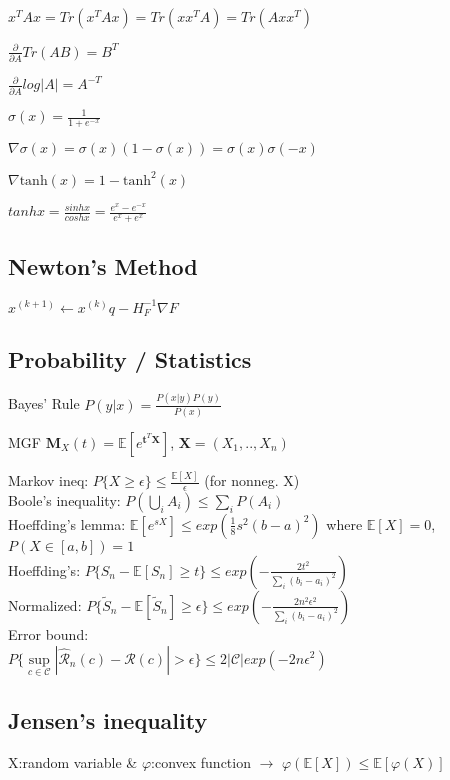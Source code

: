 \begin{inparaitem}[\color{red}\textbullet]
	\item $x^T A x = Tr(x^T A x) = Tr(x x^T A) = Tr(A x x^T)$ \\
	\item $\tfrac{\partial}{\partial A} Tr(AB) {=} B^T$
	\item $\frac{\partial}{\partial A} log|A| {=} A^{-T}$ \\
	\item $\sigma(x) = \frac{1}{1+e^{-x}}$ \\
	\item $\nabla \sigma(x) = \sigma(x)(1-\sigma(x)) = \sigma(x)\sigma(-x)$\\
	\item $\nabla \text{tanh}(x) = 1-\text{tanh}^2(x)$ 
	\item $tanhx {=} \frac{sinhx}{coshx} {=} \frac{e^{x}-e^{-x}}{e^{x} + e^{x}}$
\end{inparaitem}
\subsection*{Newton's Method}
$x^{(k+1)} \gets x^{(k)}q-H^{-1}_F\nabla F$
\subsection*{Probability / Statistics}
\begin{compactdesc}
	\item[Bayes' Rule]$ P(y|x) = \frac{P(x|y)P(y)}{P(x)}$\\
	\item[MGF] $\mathbf{M}_X(t)=\mathbb{E}[e^{\mathbf{t}^T \mathbf{X}}]$, $\mathbf{X}=(X_1,.., X_n) $
\end{compactdesc}

Markov ineq: $P\{X\geq\epsilon\} \leq \tfrac{\mathbb{E}[X]}{\epsilon}$ (for nonneg. X) \\
Boole's inequality: $P(\bigcup_i A_i) \leq \sum_i P(A_i)$ \\
Hoeffding's lemma: $\mathbb{E}[e^{sX}] \leq exp(\tfrac{1}{8}s^2(b-a)^2)$ where $\mathbb{E}[X]=0$, $P(X\in[a,b])=1$ \\
Hoeffding's: $P\{S_n {-} \mathbb{E}[S_n] {\geq} t\} {\leq} exp({-} \frac{2t^2}{\sum_i (b_i - a_i)^2})$ \\
Normalized: $P\{\widetilde{S}_n {-} \mathbb{E}[\widetilde{S}_n] {\geq} \epsilon\} {\leq} exp({-} \frac{2n^2 \epsilon ^2}{\sum_i (b_i {-} a_i)^2})$ \\
{\small Error bound: \\$P\{ \sup\limits_{c\in\mathcal{C}}|\hat{\mathcal{R}}_n(c) - \mathcal{R}(c)| > \epsilon \} \leq 2|\mathcal{C}| exp(-2n\epsilon ^2)$} 

\subsection*{Jensen's inequality}
	X:random variable \& $\varphi$:convex function $\rightarrow$ $\varphi(\mathbb{E}[X]) \leq \mathbb{E}[\varphi(X)]$
